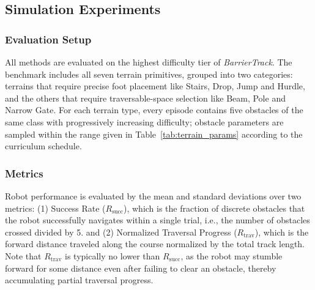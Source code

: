 \documentclass[letterpaper, 10 pt, conference]{ieeeconf/ieeeconf}
\begin{document}
\subsection{Simulation Experiments}
\subsubsection{Evaluation Setup}
All methods are evaluated on the highest difficulty tier of \textit{BarrierTrack}. The benchmark includes all seven terrain primitives, grouped into two categories: terrains that require precise foot placement like Stairs, Drop, Jump and Hurdle, and the others that require traversable-space selection like Beam, Pole and Narrow Gate. For each terrain type, every episode contains five obstacles of the same class with progressively increasing difficulty; obstacle parameters are sampled within the range given in Table~\ref{tab:terrain_params} according to the curriculum schedule.

\subsubsection{Metrics}
Robot performance is evaluated by the mean and standard deviations over two metrics:
(1) Success Rate ($R_{\mathrm{succ}}$), which is the fraction of discrete obstacles that the robot successfully navigates within a single trial, i.e., the number of obstacles crossed divided by 5. 
and (2) Normalized Traversal Progress ($R_{\mathrm{trav}}$), which is the forward distance traveled along the course normalized by the total track length. Note that $R_{\mathrm{trav}}$ is typically no lower than $R_{\mathrm{succ}}$, as the robot may stumble forward for some distance even after failing to clear an obstacle, thereby accumulating partial traversal progress.
\end{document}
